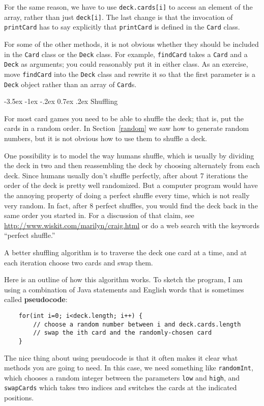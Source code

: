 \documentclass{book}
\makeatletter
\renewcommand{\section}{\@startsection 
    {section} {1} {0mm}%
    {-3.5ex \@plus -1ex \@minus -.2ex}%
    {0.7ex \@plus.2ex}%
    {\normalfont\Large\bfseries}}
\makeatother
\begin{document}
For the same reason, we have to use {\tt deck.cards[i]} to access an
element of the array, rather than just {\tt deck[i]}.  The last change
is that the invocation of {\tt printCard} has to say explicitly that
{\tt printCard} is defined in the {\tt Card} class.

For some of the other methods, it is not obvious whether they should
be included in the {\tt Card} class or the {\tt Deck} class.  For
example, {\tt findCard} takes a {\tt Card} and a {\tt Deck} as
arguments; you could reasonably put it in either class.  As an
exercise, move {\tt findCard} into the {\tt Deck} class and rewrite it
so that the first parameter is a {\tt Deck} object rather than an
array of {\tt Card}s.


\section{Shuffling}
\label{shuffle}

For most card games you need to be able to shuffle the deck;
that is, put the cards in a random order.  In Section~\ref{random}
we saw how to generate random numbers, but it is not obvious how
to use them to shuffle a deck.

One possibility is to model the way humans shuffle, which is usually
by dividing the deck in two and then reassembling the deck by choosing
alternately from each deck.  Since humans usually don't shuffle
perfectly, after about 7 iterations the order of the deck is pretty
well randomized.  But a computer program would have the annoying
property of doing a perfect shuffle every time, which is not really
very random.  In fact, after 8 perfect shuffles, you would find the
deck back in the same order you started in.  For a discussion of that
claim, see \url{http://www.wiskit.com/marilyn/craig.html} or do a web
search with the keywords ``perfect shuffle.''

A better shuffling algorithm is to traverse the deck one card at a
time, and at each iteration choose two cards and swap them.


Here is an outline of how this algorithm works.  To sketch the
program, I am using a combination of Java statements and English
words that is sometimes called {\bf pseudocode}:

\begin{verbatim}
    for(int i=0; i<deck.length; i++) {
        // choose a random number between i and deck.cards.length
        // swap the ith card and the randomly-chosen card
    }
\end{verbatim}
%
The nice thing about using pseudocode is that it often makes it
clear what methods you are going to need.  In this case, we
need something like {\tt randomInt}, which chooses a random
integer between the parameters {\tt low} and {\tt high},
and {\tt swapCards} which takes two indices and switches the
cards at the indicated positions.
\end{document}
